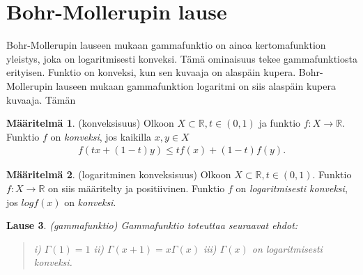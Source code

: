 \documentclass[12pt]{article}
\theoremstyle{definition}
\newtheorem{maar}{Määritelmä}
\theoremstyle{plain}
\newtheorem{lause}[maar]{Lause}
\begin{document}
\newpage





\section{Bohr-Mollerupin lause}
\onehalfspacing
Bohr-Mollerupin lauseen mukaan gammafunktio on ainoa kertomafunktion yleistys, joka on logaritmisesti konveksi. Tämä ominaisuus tekee gammafunktiosta erityisen. Funktio on konveksi, kun sen kuvaaja on alaspäin kupera. Bohr-Mollerupin lauseen mukaan gammafunktion logaritmi on siis alaspäin kupera kuvaaja.
\newline
Tämän 

\begin{maar}
(konveksisuus)
Olkoon $X\subset\mathbb{R}, t \in (0, 1)$ ja funktio $f: X \rightarrow \mathbb{R}$. Funktio $f$ on \emph{konveksi}, jos kaikilla $x,y \in X$
\begin{align*}
    f(tx+(1-t)y) \le tf(x)+(1-t)f(y).
\end{align*}
\end{maar}


\begin{maar}
(logaritminen konveksisuus)
Olkoon $X\subset\mathbb{R}, t \in (0, 1)$. Funktio $f: X \rightarrow \mathbb{R}$ on siis määritelty ja positiivinen. Funktio $f$ on \emph{logaritmisesti konveksi}, jos $logf(x)$ on \emph{konveksi}.
\end{maar}


\begin{lause}
(gammafunktio) Gammafunktio  toteuttaa seuraavat ehdot:
\begin{quote}
    i) $\Gamma(1)=1$ \newline
    ii) $\Gamma(x+1)=x\Gamma(x)$ \newline
    iii) $\Gamma(x)$ on logaritmisesti konveksi.
\end{quote}
\end{lause}
\end{document}
